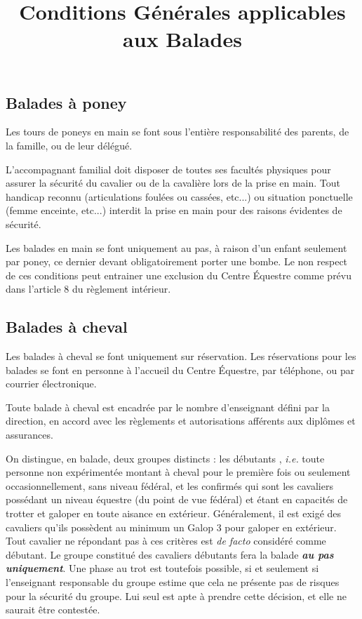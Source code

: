 \documentclass[11pt,a4paper]{article}
\title{Conditions Générales applicables aux Balades}
\author{}
\date{}
\renewcommand{\emph}[1]{\textit{\textbf{#1}}}
\begin{document}
\maketitle


\subsection*{Balades à poney}
Les tours de poneys en main se font sous l'entière responsabilité des parents, de la famille, ou de leur délégué. \par
L'accompagnant familial doit disposer de toutes ses facultés physiques pour assurer la sécurité du cavalier ou de la cavalière lors de la prise en main. Tout handicap reconnu (articulations foulées ou cassées, etc...) ou situation ponctuelle (femme enceinte, etc...) interdit la prise en main pour des raisons évidentes de sécurité.

Les balades en main se font uniquement au pas, à raison d'un enfant seulement par poney, ce dernier devant obligatoirement porter une bombe. Le non respect de ces conditions peut entrainer une exclusion du Centre Équestre comme prévu dans l'article 8 du règlement intérieur.

\subsection*{Balades à cheval}
Les balades à cheval se font uniquement sur réservation. Les réservations pour les balades se font en personne à l'accueil du Centre Équestre, par téléphone, ou par courrier électronique.

Toute balade à cheval est encadrée par le nombre d'enseignant défini par la direction, en accord avec les règlements et autorisations afférents aux diplômes et assurances.

On distingue, en balade, deux groupes distincts : les \og débutants \fg{}, \textit{i.e.} toute personne non expérimentée montant à cheval pour le première fois ou seulement occasionnellement, sans niveau fédéral, et les \og confirmés \fg{} qui sont les cavaliers possédant un niveau équestre (du point de vue fédéral) et étant en capacités de trotter et galoper en toute aisance en extérieur. Généralement, il est exigé des cavaliers qu'ils possèdent au minimum un Galop 3 pour galoper en extérieur. Tout cavalier ne répondant pas à ces critères est \textit{de facto} considéré comme débutant. Le groupe constitué des cavaliers débutants fera la balade \emph{au pas uniquement}. Une phase au trot est toutefois possible, si et seulement si l'enseignant responsable du groupe estime que cela ne présente pas de risques pour la sécurité du groupe. Lui seul est apte à prendre cette décision, et elle ne saurait être contestée.
\end{document}
